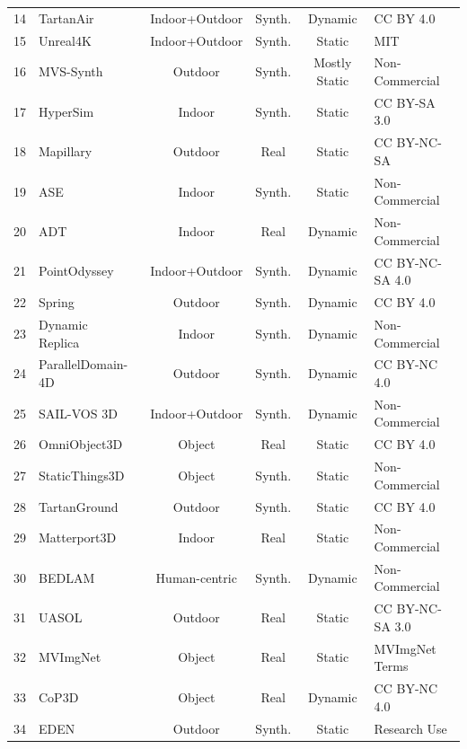\begin{table}[h]
\begin{tabularx}{\textwidth}{@{}c >{\centering\arraybackslash}X c c c >{\centering\arraybackslash}X@{}}
14 & TartanAir~\cite{wang2020tartanair} & Indoor+Outdoor & Synth. & Dynamic & CC BY 4.0 \\
15 & Unreal4K~\cite{tosi2021unreal} & Indoor+Outdoor & Synth. & Static & MIT \\
16 & MVS-Synth~\cite{huang2018mvs} & Outdoor & Synth. & Mostly Static & Non-Commercial \\
17 & HyperSim~\cite{roberts2021hypersim} & Indoor & Synth. & Static & CC BY-SA 3.0 \\
18 & Mapillary~\cite{antequera2020mapillary} & Outdoor & Real & Static & CC BY-NC-SA \\
19 & ASE~\cite{avetisyan2024scenescript} & Indoor & Synth. & Static & Non-Commercial \\
20 & ADT~\cite{pan2023aria} & Indoor & Real & Dynamic & Non-Commercial \\
21 & PointOdyssey~\cite{zheng2023pointodyssey} & Indoor+Outdoor & Synth. & Dynamic & CC BY-NC-SA 4.0 \\
22 & Spring~\cite{mehl2023spring} & Outdoor & Synth. & Dynamic & CC BY 4.0 \\
23 & Dynamic Replica~\cite{Karaev_2023_dynamic_stereo} & Indoor & Synth. & Dynamic & Non-Commercial \\
24 & ParallelDomain-4D~\cite{vanhoorick2024gcd} & Outdoor & Synth. & Dynamic & CC BY-NC 4.0 \\
25 & SAIL-VOS 3D~\cite{hu2021sailvos3d} & Indoor+Outdoor & Synth. & Dynamic & Non-Commercial \\
26 & OmniObject3D~\cite{wu2023omniobject3d} & Object & Real & Static & CC BY 4.0 \\
27 & StaticThings3D~\cite{schroeppel2022rmvd} & Object & Synth. & Static & Non-Commercial \\
28 & TartanGround~\cite{patel2025tartanground} & Outdoor & Synth. & Static & CC BY 4.0 \\
29 & Matterport3D~\cite{chang2017matterport3d} & Indoor & Real & Static & Non-Commercial \\
30 & BEDLAM~\cite{black2023bedlam} & Human-centric & Synth. & Dynamic & Non-Commercial \\
31 & UASOL~\cite{bauer2019uasol} & Outdoor & Real & Static & CC BY-NC-SA 3.0 \\
32 & MVImgNet~\cite{yu2023mvimgnet} & Object & Real & Static & MVImgNet Terms \\
33 & CoP3D~\cite{sinha2023cop3d} & Object & Real & Dynamic & CC BY-NC 4.0 \\
34 & EDEN~\cite{le2021eden} & Outdoor & Synth. & Static & Research Use \\

\end{tabularx}
\end{table}
